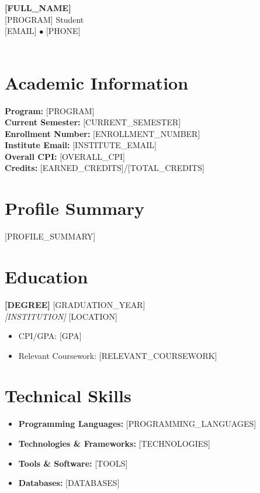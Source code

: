 \documentclass[11pt,a4paper]{article}
\newcommand{\resumeheader}[6]{
    \begin{center}
        {\Large\textbf{#1}} \\
        \vspace{0.2cm}
        #2 \\
        \vspace{0.1cm}
        #3 $\bullet$ #4 \\
        #5 \\
        #6
    \end{center}
    \vspace{0.3cm}
}
\newcommand{\resumeentry}[4]{
    \textbf{#1} \hfill #2 \\
    \textit{#3} \hfill #4 \\
    \vspace{0.1cm}
}
\newcommand{\infobox}[2]{
    \textbf{#1:} #2
}
\begin{document}
\resumeheader{[FULL_NAME]}{[PROGRAM] Student}{[EMAIL]}{[PHONE]}{[ADDRESS]}{[ENROLLMENT_NUMBER]}

\section{Academic Information}
\begin{multicols}{2}
\infobox{Program}{[PROGRAM]} \\
\infobox{Current Semester}{[CURRENT_SEMESTER]} \\
\infobox{Enrollment Number}{[ENROLLMENT_NUMBER]} \\
\infobox{Institute Email}{[INSTITUTE_EMAIL]} \\
\infobox{Overall CPI}{[OVERALL_CPI]} \\
\infobox{Credits}{[EARNED_CREDITS]/[TOTAL_CREDITS]}
\end{multicols}

\section{Profile Summary}
[PROFILE_SUMMARY]

\section{Education}
\resumeentry{[DEGREE]}{[GRADUATION_YEAR]}{[INSTITUTION]}{[LOCATION]}
\begin{itemize}[leftmargin=0.2in]
    \item CPI/GPA: [GPA]
    \item Relevant Coursework: [RELEVANT_COURSEWORK]
\end{itemize}

\section{Technical Skills}
\begin{itemize}[leftmargin=0.2in]
    \item \textbf{Programming Languages:} [PROGRAMMING_LANGUAGES]
    \item \textbf{Technologies \& Frameworks:} [TECHNOLOGIES]
    \item \textbf{Tools \& Software:} [TOOLS]
    \item \textbf{Databases:} [DATABASES]
\end{itemize}

\end{document}
